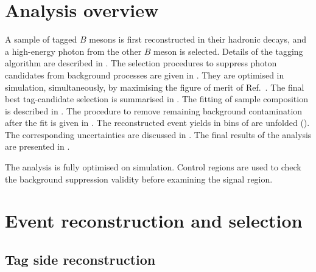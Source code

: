 \section{Analysis overview}\label{sec:analysis_flow}

A sample of tagged $B$ mesons is first reconstructed in their hadronic decays, and a high-energy photon from the other $B$ meson is selected. Details of the tagging algorithm are described in . The selection procedures to suppress photon candidates from background processes are given in . They are optimised in simulation, simultaneously, by maximising the figure of merit of Ref.~\cite{Punzi}. The final best tag-candidate selection is summarised in .
The fitting of sample composition is described in . The procedure to remove remaining background contamination after the fit is given in . The reconstructed \BtoXsgamma event yields in bins of \EB are unfolded (). The corresponding uncertainties are discussed in . The final results of the analysis are presented in .

The analysis is fully optimised on simulation. Control regions are used to check the background suppression validity before examining the signal region.

\section{Event reconstruction and selection}\label{sec:selection}



\subsection{Tag side reconstruction}\label{sec:tag_side_reconstruction}


